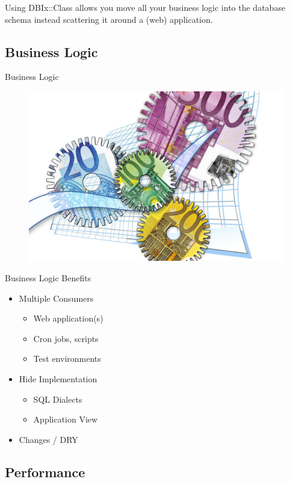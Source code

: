 Using DBIx::Class allows you move all your business logic
into the database schema instead scattering it around a (web)
application.

\subsection{Business Logic}
\begin{frame}{Business Logic}
\begin{figure}[!ht]
\centering
\includegraphics[width=0.75\linewidth]{img/business-logic.jpg}
\end{figure}
\end{frame}

\begin{frame}{Business Logic Benefits}
\begin{itemize}
\item Multiple Consumers
\begin{itemize}
\item Web application(s)
\item Cron jobs, scripts
\item Test environments
\end{itemize}
\item Hide Implementation
\begin{itemize}
\item SQL Dialects
\item Application View
\end{itemize}
\item Changes / DRY
\end{itemize}
\end{frame}

\subsection{Performance}

